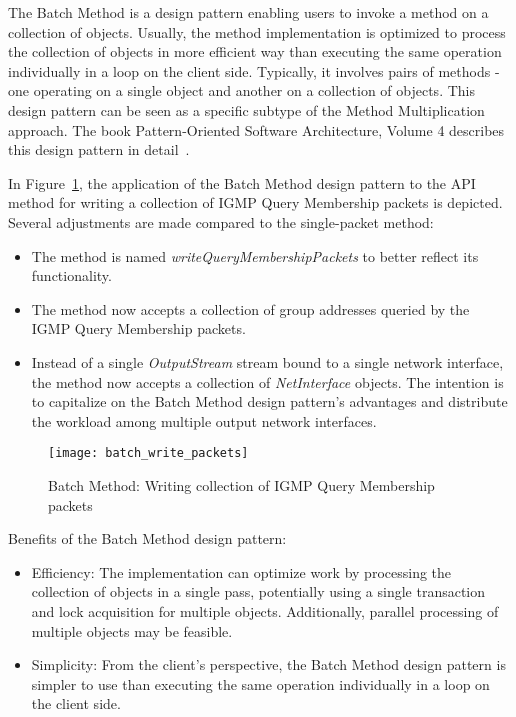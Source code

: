 The Batch Method is a design pattern enabling users to invoke a method on a collection of objects.
Usually, the method implementation is optimized to process the collection of objects in more efficient way
than executing the same operation individually in a loop on the client side.
Typically, it involves pairs of methods - one operating on a single object and another on a collection of objects.
This design pattern can be seen as a specific subtype of the Method Multiplication approach.
The book Pattern-Oriented Software Architecture, Volume 4 describes this design pattern
in detail~\cite[Chapter~12]{posa4}.

In Figure~\ref{fig:batch_write_packets}, the application of the Batch Method design pattern to the API method
for writing a collection of IGMP Query Membership packets is depicted.
Several adjustments are made compared to the single-packet method:

\begin{itemize}
    \item
    The method is named \textit{writeQueryMembershipPackets} to better reflect its functionality.
    \item
    The method now accepts a collection of group addresses queried by the IGMP Query Membership packets.
    \item
    Instead of a single \textit{OutputStream} stream bound to a single network interface, the method now accepts
    a collection of \textit{NetInterface} objects.
    The intention is to capitalize on the Batch Method design pattern's advantages and distribute the workload among
    multiple output network interfaces.
\end{itemize}

\begin{figure}[!htb]
    \centering
    \texttt{[image: batch\_write\_packets]}
    \caption{Batch Method: Writing collection of IGMP Query Membership packets}
    \label{fig:batch_write_packets}
\end{figure}

Benefits of the Batch Method design pattern:

\begin{itemize}
    \item Efficiency:
    The implementation can optimize work by processing the collection of objects in a single pass,
    potentially using a single transaction and lock acquisition for multiple objects.
    Additionally, parallel processing of multiple objects may be feasible.
    \item Simplicity:
    From the client's perspective, the Batch Method design pattern is simpler to use than executing the same operation
    individually in a loop on the client side.
\end{itemize}


